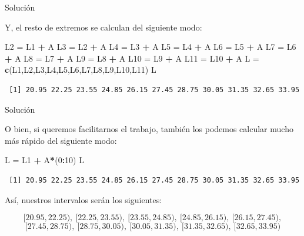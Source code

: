 \documentclass[
  ignorenonframetext,
]{beamer}
\newenvironment{Shaded}{\begin{snugshade}}{\end{snugshade}}
\newcommand{\DecValTok}[1]{\textcolor[rgb]{0.00,0.00,0.81}{#1}}
\newcommand{\KeywordTok}[1]{\textcolor[rgb]{0.13,0.29,0.53}{\textbf{#1}}}
\newcommand{\NormalTok}[1]{#1}
\newcommand{\OperatorTok}[1]{\textcolor[rgb]{0.81,0.36,0.00}{\textbf{#1}}}
\newcommand{\StringTok}[1]{\textcolor[rgb]{0.31,0.60,0.02}{#1}}
\begin{document}
\begin{frame}[fragile]{Solución}
\protect\hypertarget{soluciuxf3n-6}{}

Y, el resto de extremos se calculan del siguiente modo:

\begin{Shaded}
\begin{Highlighting}[]
\NormalTok{L2 =}\StringTok{ }\NormalTok{L1 }\OperatorTok{+}\StringTok{ }\NormalTok{A}
\NormalTok{L3 =}\StringTok{ }\NormalTok{L2 }\OperatorTok{+}\StringTok{ }\NormalTok{A}
\NormalTok{L4 =}\StringTok{ }\NormalTok{L3 }\OperatorTok{+}\StringTok{ }\NormalTok{A}
\NormalTok{L5 =}\StringTok{ }\NormalTok{L4 }\OperatorTok{+}\StringTok{ }\NormalTok{A}
\NormalTok{L6 =}\StringTok{ }\NormalTok{L5 }\OperatorTok{+}\StringTok{ }\NormalTok{A}
\NormalTok{L7 =}\StringTok{ }\NormalTok{L6 }\OperatorTok{+}\StringTok{ }\NormalTok{A}
\NormalTok{L8 =}\StringTok{ }\NormalTok{L7 }\OperatorTok{+}\StringTok{ }\NormalTok{A}
\NormalTok{L9 =}\StringTok{ }\NormalTok{L8 }\OperatorTok{+}\StringTok{ }\NormalTok{A}
\NormalTok{L10 =}\StringTok{ }\NormalTok{L9 }\OperatorTok{+}\StringTok{ }\NormalTok{A}
\NormalTok{L11 =}\StringTok{ }\NormalTok{L10 }\OperatorTok{+}\StringTok{ }\NormalTok{A}
\NormalTok{L =}\StringTok{ }\KeywordTok{c}\NormalTok{(L1,L2,L3,L4,L5,L6,L7,L8,L9,L10,L11)}
\NormalTok{L}
\end{Highlighting}
\end{Shaded}

\begin{verbatim}
 [1] 20.95 22.25 23.55 24.85 26.15 27.45 28.75 30.05 31.35 32.65 33.95
\end{verbatim}

\end{frame}

\begin{frame}[fragile]{Solución}
\protect\hypertarget{soluciuxf3n-7}{}

O bien, si queremos facilitarnos el trabajo, también los podemos
calcular mucho más rápido del siguiente modo:

\begin{Shaded}
\begin{Highlighting}[]
\NormalTok{L =}\StringTok{ }\NormalTok{L1 }\OperatorTok{+}\StringTok{ }\NormalTok{A}\OperatorTok{*}\NormalTok{(}\DecValTok{0}\OperatorTok{:}\DecValTok{10}\NormalTok{)}
\NormalTok{L}
\end{Highlighting}
\end{Shaded}

\begin{verbatim}
 [1] 20.95 22.25 23.55 24.85 26.15 27.45 28.75 30.05 31.35 32.65 33.95
\end{verbatim}

Así, nuestros intervalos serán los siguientes:

\[[20.95,22.25),\ [22.25,23.55),\ [23.55,24.85),\ [24.85,26.15),\ [26.15,27.45),\]
\[[27.45,28.75),\ [28.75,30.05),\ [30.05,31.35),\ [31.35,32.65),\ [32.65,33.95)\]

\end{frame}
\end{document}
